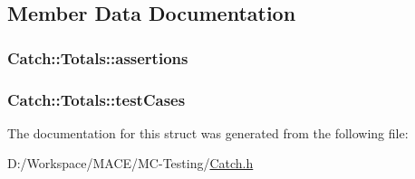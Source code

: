\subsection{Member Data Documentation}
\subsubsection[{\texorpdfstring{assertions}{assertions}}]{ Catch\+::\+Totals\+::assertions}\hypertarget{struct_catch_1_1_totals_a885ded66df752147b30c3d45aa602ec9}{}\label{struct_catch_1_1_totals_a885ded66df752147b30c3d45aa602ec9}
\subsubsection[{\texorpdfstring{test\+Cases}{testCases}}]{ Catch\+::\+Totals\+::test\+Cases}\hypertarget{struct_catch_1_1_totals_adb195fe477aedee2ecea88c888f16506}{}\label{struct_catch_1_1_totals_adb195fe477aedee2ecea88c888f16506}


The documentation for this struct was generated from the following file\+:\begin{DoxyCompactItemize}
\item 
D\+:/\+Workspace/\+M\+A\+C\+E/\+M\+C-\/\+Testing/\hyperlink{_catch_8h}{Catch.\+h}\end{DoxyCompactItemize}
